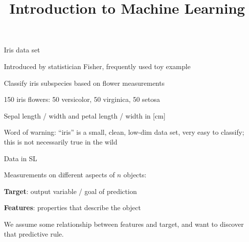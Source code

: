 \documentclass[11pt,compress,t,notes=noshow, xcolor=table]{beamer}
\title{Introduction to Machine Learning}
\begin{document}


\begin{framei}{Iris data set}
\item Introduced by statistician Fisher, frequently used toy example
\item Classify iris subspecies based on flower measurements
\item 150 iris flowers: 50 versicolor, 50 virginica, 50 setosa
\item Sepal length / width and petal length / width in [cm]
\vfill
{}
\item Word of warning: ``iris'' is a small, clean, low-dim data set, very easy to classify; this is not necessarily true in the wild 
\end{framei}


\begin{framei}{Data in SL}
\item Measurements on different aspects of $n$ objects:
\begin{itemizeL}
\item \textbf{Target}: output variable / goal of prediction
\item \textbf{Features}: properties that describe the object
\end{itemizeL}
\item We assume some relationship between features and target, and want to discover that predictive rule.
\vfill
{}
\end{framei}
\end{document}
